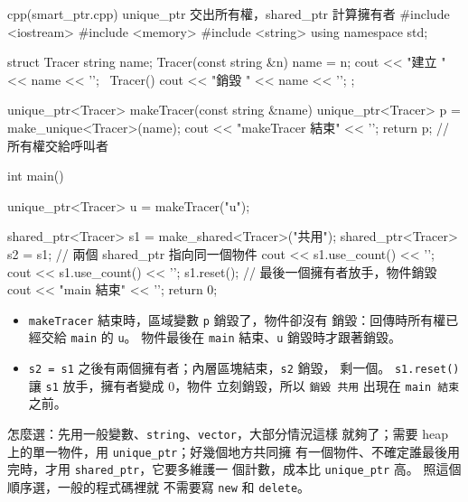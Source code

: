 \begin{example}[label=ex:smart-ptr]{cpp}{(smart\_ptr.cpp) unique\_ptr 交出所有權，shared\_ptr 計算擁有者}
#include <iostream>
#include <memory>
#include <string>
using namespace std;

struct Tracer {
    string name;
    Tracer(const string &n) { name = n; cout << "建立 " << name << '\n'; }
    ~Tracer() { cout << "銷毀 " << name << '\n'; }
};

unique_ptr<Tracer> makeTracer(const string &name) {
    unique_ptr<Tracer> p = make_unique<Tracer>(name);
    cout << "makeTracer 結束" << '\n';
    return p;                      // 所有權交給呼叫者
}

int main() {
    unique_ptr<Tracer> u = makeTracer("u");

    shared_ptr<Tracer> s1 = make_shared<Tracer>("共用");
    {
        shared_ptr<Tracer> s2 = s1;  // 兩個 shared_ptr 指向同一個物件
        cout << s1.use_count() << '\n';
    }
    cout << s1.use_count() << '\n';
    s1.reset();                      // 最後一個擁有者放手，物件銷毀
    cout << "main 結束" << '\n';
    return 0;
}
\end{example}


\begin{itemize}
\item \texttt{makeTracer} 結束時，區域變數 \texttt{p} 銷毀了，物件卻沒有
銷毀：回傳時所有權已經交給 \texttt{main} 的 \texttt{u}。 物件最後在
\texttt{main} 結束、\texttt{u} 銷毀時才跟著銷毀。
\item \texttt{s2 = s1} 之後有兩個擁有者；內層區塊結束，\texttt{s2} 銷毀，
剩一個。 \texttt{s1.reset()} 讓 \texttt{s1} 放手，擁有者變成 $0$，物件
立刻銷毀，所以 \texttt{銷毀 共用} 出現在 \texttt{main 結束} 之前。
\end{itemize}

怎麼選：先用一般變數、\texttt{string}、\texttt{vector}，大部分情況這樣
就夠了；需要 heap 上的單一物件，用 \texttt{unique\_ptr}；好幾個地方共同擁
有一個物件、不確定誰最後用完時，才用 \texttt{shared\_ptr}，它要多維護一
個計數，成本比 \texttt{unique\_ptr} 高。 照這個順序選，一般的程式碼裡就
不需要寫 \texttt{new} 和 \texttt{delete}。

